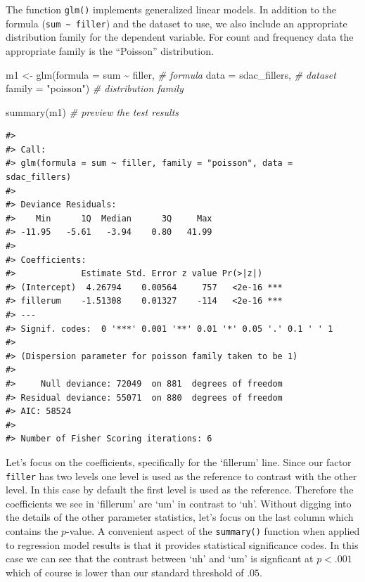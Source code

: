 \documentclass[
  letterpaper,
]{scrbook}
\newenvironment{Shaded}{\begin{snugshade}}{\end{snugshade}}
\newcommand{\AttributeTok}[1]{\textcolor[rgb]{0.00,0.00,0.00}{#1}}
\newcommand{\CommentTok}[1]{\textcolor[rgb]{0.00,0.00,0.00}{\textit{#1}}}
\newcommand{\FunctionTok}[1]{\textcolor[rgb]{0.00,0.00,0.00}{#1}}
\newcommand{\NormalTok}[1]{\textcolor[rgb]{0.00,0.00,0.00}{#1}}
\newcommand{\OtherTok}[1]{\textcolor[rgb]{0.00,0.00,0.00}{#1}}
\newcommand{\SpecialCharTok}[1]{\textcolor[rgb]{0.00,0.00,0.00}{#1}}
\newcommand{\StringTok}[1]{\textcolor[rgb]{0.00,0.00,0.00}{#1}}
\begin{document}
The function \texttt{glm()} implements generalized linear models. In
addition to the formula (\texttt{sum\ \textasciitilde{}\ filler}) and
the dataset to use, we also include an appropriate distribution family
for the dependent variable. For count and frequency data the appropriate
family is the ``Poisson'' distribution.

\begin{Shaded}
\begin{Highlighting}[]
\NormalTok{m1 }\OtherTok{\textless{}{-}} 
  \FunctionTok{glm}\NormalTok{(}\AttributeTok{formula =}\NormalTok{ sum }\SpecialCharTok{\textasciitilde{}}\NormalTok{ filler, }\CommentTok{\# formula}
      \AttributeTok{data =}\NormalTok{ sdac\_fillers, }\CommentTok{\# dataset}
      \AttributeTok{family =} \StringTok{"poisson"}\NormalTok{) }\CommentTok{\# distribution family}

\FunctionTok{summary}\NormalTok{(m1) }\CommentTok{\# preview the test results}
\end{Highlighting}
\end{Shaded}

\begin{verbatim}
#> 
#> Call:
#> glm(formula = sum ~ filler, family = "poisson", data = sdac_fillers)
#> 
#> Deviance Residuals: 
#>    Min      1Q  Median      3Q     Max  
#> -11.95   -5.61   -3.94    0.80   41.99  
#> 
#> Coefficients:
#>             Estimate Std. Error z value Pr(>|z|)    
#> (Intercept)  4.26794    0.00564     757   <2e-16 ***
#> fillerum    -1.51308    0.01327    -114   <2e-16 ***
#> ---
#> Signif. codes:  0 '***' 0.001 '**' 0.01 '*' 0.05 '.' 0.1 ' ' 1
#> 
#> (Dispersion parameter for poisson family taken to be 1)
#> 
#>     Null deviance: 72049  on 881  degrees of freedom
#> Residual deviance: 55071  on 880  degrees of freedom
#> AIC: 58524
#> 
#> Number of Fisher Scoring iterations: 6
\end{verbatim}

Let's focus on the coefficients, specifically for the `fillerum' line.
Since our factor \texttt{filler} has two levels one level is used as the
reference to contrast with the other level. In this case by default the
first level is used as the reference. Therefore the coefficients we see
in `fillerum' are `um' in contrast to `uh'. Without digging into the
details of the other parameter statistics, let's focus on the last
column which contains the \(p\)-value. A convenient aspect of the
\texttt{summary()} function when applied to regression model results is
that it provides statistical significance codes. In this case we can see
that the contrast between `uh' and `um' is signficant at \(p < .001\)
which of course is lower than our standard threshold of \(.05\).
\end{document}
